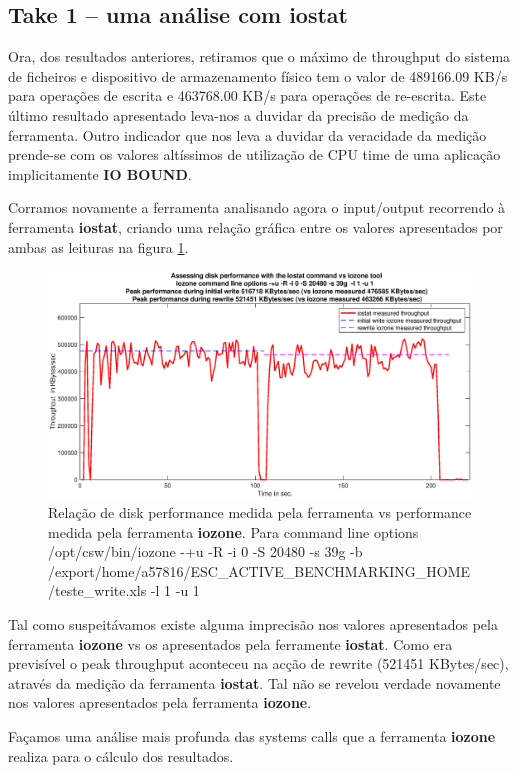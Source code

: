 \documentclass[a4paper]{article}
\begin{document}
{ \subsection{Take 1 -- uma análise com iostat}
Ora, dos resultados anteriores, retiramos que o máximo de throughput do sistema de ficheiros e dispositivo de armazenamento físico tem o valor de 489166.09 KB/s para operações de escrita e 463768.00 KB/s para operações de re-escrita. Este último resultado apresentado leva-nos a duvidar da precisão de medição da ferramenta. Outro indicador que nos leva a duvidar da veracidade da medição prende-se com os valores altíssimos de utilização de CPU time de uma aplicação implicitamente \textbf{IO BOUND}.\par 
Corramos novamente a ferramenta analisando agora o input/output recorrendo à ferramenta \textbf{iostat}, criando uma relação gráfica entre os valores apresentados por ambas as leituras na figura \ref{fig:iostat}.

\begin{figure}[H]
\centering
\includegraphics[width=1.1\columnwidth]{EPS/iostat.eps}
\caption{Relação de disk performance medida pela ferramenta  vs performance medida pela ferramenta \textbf{iozone}. Para command line options /opt/csw/bin/iozone -+u -R -i 0 -S 20480 -s 39g -b /export/home/a57816/ESC\_ACTIVE\_BENCHMARKING\_HOME/teste\_write.xls -l 1 -u 1
}
\label{fig:iostat}
\end{figure}

Tal como suspeitávamos existe alguma imprecisão nos valores apresentados pela ferramenta \textbf{iozone} vs os apresentados pela ferramente \textbf{iostat}. Como era previsível o peak throughput aconteceu na acção de rewrite (521451 KBytes/sec), através da medição da ferramenta \textbf{iostat}. Tal não se revelou verdade novamente nos valores apresentados pela ferramenta \textbf{iozone}. 
\par 
Façamos uma análise mais profunda das systems calls que a ferramenta \textbf{iozone} realiza para o cálculo dos resultados.

}
\end{document}
